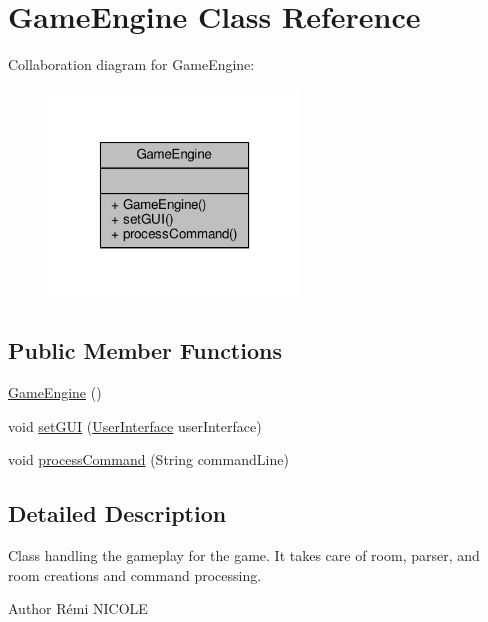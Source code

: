 \hypertarget{classGameEngine}{\section{Game\-Engine Class Reference}
\label{classGameEngine}
}


Collaboration diagram for Game\-Engine\-:
\nopagebreak
\begin{figure}[H]
\begin{center}
\leavevmode
\includegraphics[width=190pt]{classGameEngine__coll__graph}
\end{center}
\end{figure}
\subsection*{Public Member Functions}
\begin{DoxyCompactItemize}
\item 
\hyperlink{classGameEngine_a9e8a92f5021a34293060f9aaff4005de}{Game\-Engine} ()
\item 
void \hyperlink{classGameEngine_aec901a5b590b3cd204f196165da5dfb6}{set\-G\-U\-I} (\hyperlink{classUserInterface}{User\-Interface} user\-Interface)
\item 
void \hyperlink{classGameEngine_ad7133885f313fa99bca3bb7cb8272f64}{process\-Command} (String command\-Line)
\end{DoxyCompactItemize}


\subsection{Detailed Description}
Class handling the gameplay for the game. It takes care of room, parser, and room creations and command processing.

\begin{DoxyAuthor}{Author}
Rémi N\-I\-C\-O\-L\-E 
\end{DoxyAuthor}


